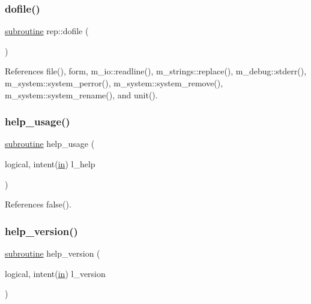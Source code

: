 \subsubsection{\texorpdfstring{dofile()}{dofile()}}
{\footnotesize\ttfamily \hyperlink{M__stopwatch_83_8txt_acfbcff50169d691ff02d4a123ed70482}{subroutine} rep\+::dofile (\begin{DoxyParamCaption}{ }\end{DoxyParamCaption})}



References file(), form, m\+\_\+io\+::readline(), m\+\_\+strings\+::replace(), m\+\_\+debug\+::stderr(), m\+\_\+system\+::system\+\_\+perror(), m\+\_\+system\+::system\+\_\+remove(), m\+\_\+system\+::system\+\_\+rename(), and unit().

\mbox{\label{rep_8f90_a3e09a3b52ee8fb04eeb93fe5761626a8}} 
\subsubsection{\texorpdfstring{help\+\_\+usage()}{help\_usage()}}
{\footnotesize\ttfamily \hyperlink{M__stopwatch_83_8txt_acfbcff50169d691ff02d4a123ed70482}{subroutine} help\+\_\+usage (\begin{DoxyParamCaption}\item[{logical, intent(\hyperlink{M__journal_83_8txt_afce72651d1eed785a2132bee863b2f38}{in})}]{l\+\_\+help }\end{DoxyParamCaption})}



References false().

\mbox{\label{rep_8f90_a39c21619b08a3c22f19e2306efd7f766}} 
\subsubsection{\texorpdfstring{help\+\_\+version()}{help\_version()}}
{\footnotesize\ttfamily \hyperlink{M__stopwatch_83_8txt_acfbcff50169d691ff02d4a123ed70482}{subroutine} help\+\_\+version (\begin{DoxyParamCaption}\item[{logical, intent(\hyperlink{M__journal_83_8txt_afce72651d1eed785a2132bee863b2f38}{in})}]{l\+\_\+version }\end{DoxyParamCaption})}



